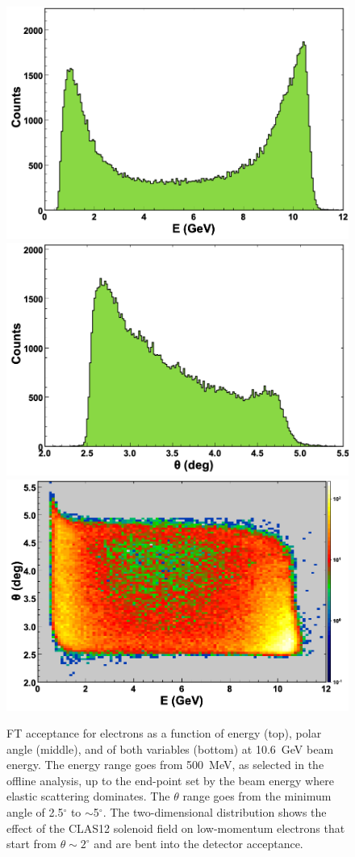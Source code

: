 \begin{figure}[ht]
\begin{center}
\includegraphics[height=0.5\columnwidth]{fig/ft_acceptance_energy.png}
\includegraphics[height=0.5\columnwidth]{fig/ft_acceptance_theta.png}
\includegraphics[height=0.5\columnwidth]{fig/ft_acceptance_energytheta.png}
\end{center}
\caption{FT acceptance for electrons as a function of energy (top), polar angle (middle), and of both
  variables (bottom) at 10.6~GeV beam energy. The energy range goes from 500~MeV, as selected in the offline
  analysis, up to the end-point set by the beam energy where elastic scattering dominates. The $\theta$ range goes
  from the minimum angle of 2.5$^\circ$ to $\sim$5$^\circ$. The two-dimensional distribution shows the effect of the
  CLAS12 solenoid field on low-momentum electrons that start from $\theta\sim2^\circ$ and are bent into the
  detector acceptance. }
\label{fig:ft_acceptance}
\end{figure}

